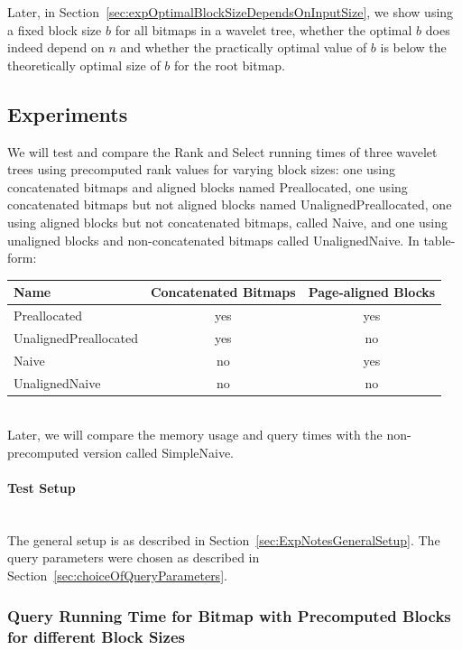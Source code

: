 Later, in Section~\ref{sec:expOptimalBlockSizeDependsOnInputSize}, we show using a fixed block size $b$ for all bitmaps in a wavelet tree, whether the optimal $b$ does indeed depend on $n$ and whether the practically optimal value of $b$ is below the theoretically optimal size of $b$ for the root bitmap.



\subsection{Experiments}
We will test and compare the Rank and Select running times of three wavelet trees using precomputed rank values for varying block sizes: one using concatenated bitmaps and aligned blocks named Preallocated, one using concatenated bitmaps but not aligned blocks named UnalignedPreallocated, one using aligned blocks but not concatenated bitmaps, called Naive,
and one using unaligned blocks and non-concatenated bitmaps called UnalignedNaive.
In table-form:\\
\begin{tabular}{|lcc|}
\hline
Name						& Concatenated Bitmaps	& Page-aligned Blocks	\\ \hline
Preallocated				& yes					& yes					\\ \hline
UnalignedPreallocated	& yes					& no						\\ \hline
Naive					& no						& yes					\\ \hline
UnalignedNaive			& no						& no						\\ \hline
\end{tabular}\\

\noindent Later, we will compare the memory usage and query times with the non-precomputed version called SimpleNaive.

\paragraph{Test Setup}~\\
The general setup is as described in Section~\ref{sec:ExpNotesGeneralSetup}.
The query parameters were chosen as described in Section~\ref{sec:choiceOfQueryParameters}.

\subsubsection{Query Running Time for Bitmap with Precomputed Blocks for different Block Sizes}
\label{sec:queryRunTimePrecomputedBlockSizes}

